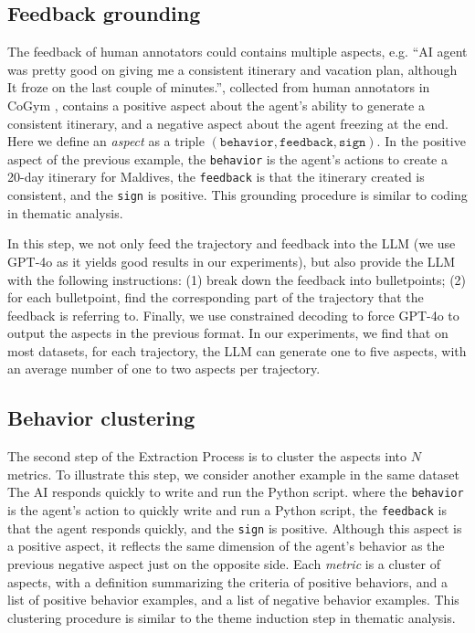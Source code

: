 \subsection{Feedback grounding}
\label{sec:grounding}
The feedback of human annotators could contains multiple aspects, e.g. \textsf{``AI agent was pretty good
on giving me a consistent itinerary and vacation plan, although It froze on the last couple of minutes.''},
collected from human annotators in CoGym \citep{shao2024collaborative}, contains a positive aspect
about the agent's ability to generate a consistent itinerary, and a negative aspect about the agent freezing
at the end. Here we define an \emph{aspect} as a triple $(\texttt{behavior}, \texttt{feedback}, \texttt{sign})$.
In the positive aspect of the previous example, the \texttt{behavior} is the agent's actions to create
a 20-day itinerary for Maldives, the \texttt{feedback} is that the itinerary created is consistent, 
and the \texttt{sign} is positive. This grounding procedure is similar to coding in thematic analysis.

In this step, we not only feed the trajectory and feedback into the LLM (we use GPT-4o \citep{openai2024gpt4ocard} 
as it yields good results in our experiments), but also provide the LLM with the following instructions:
(1) break down the feedback into bulletpoints; (2) for each bulletpoint, find the corresponding
part of the trajectory that the feedback is referring to. Finally, we use constrained decoding to force GPT-4o
to output the aspects in the previous format. In our experiments, we find that on most datasets, for each
trajectory, the LLM can generate one to five aspects, with an average number of one to two aspects per trajectory.


\subsection{Behavior clustering}
\label{sec:clustering}

The second step of the Extraction Process is to cluster the aspects into $N$ metrics.
To illustrate this step, we consider another example in the same dataset
\textsf{The AI responds quickly to write and run the Python script.} where
the \texttt{behavior} is the agent's action to quickly write and run a Python script, the \texttt{feedback}
is that the agent responds quickly, and the \texttt{sign} is positive. Although this aspect is a positive aspect,
it reflects the same dimension of the agent's behavior as the previous negative aspect just on the opposite side.
Each \emph{metric} is a cluster of aspects, with a definition summarizing the criteria of positive behaviors,
and a list of positive behavior examples, and a list of negative behavior examples. This clustering procedure
is similar to the theme induction step in thematic analysis.

